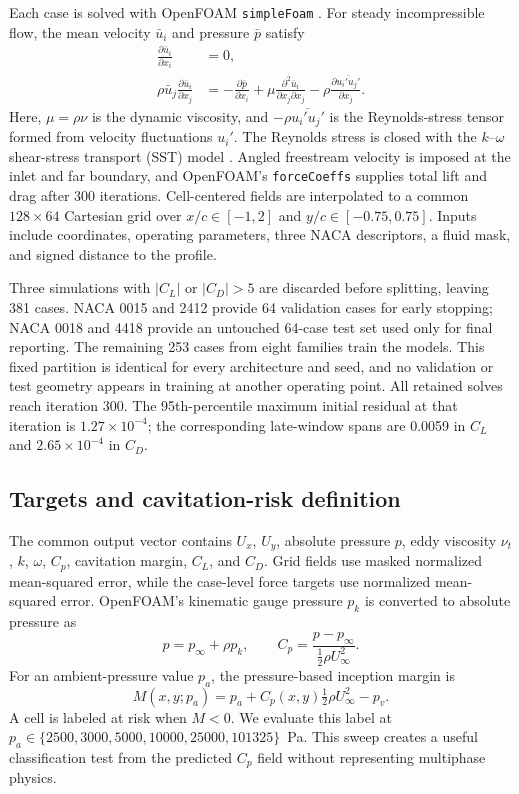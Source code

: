 \documentclass{article}
\begin{document}
Each case is solved with OpenFOAM \texttt{simpleFoam}
\citep{weller1998tensorial}. For steady incompressible flow, the mean velocity
$\bar{u}_i$ and pressure $\bar{p}$ satisfy
\begin{align}
\frac{\partial \bar{u}_i}{\partial x_i}&=0,\\
\rho\bar{u}_j\frac{\partial\bar{u}_i}{\partial x_j}
&=-\frac{\partial\bar{p}}{\partial x_i}
+\mu\frac{\partial^2\bar{u}_i}{\partial x_j\partial x_j}
-\rho\frac{\partial\overline{u_i'u_j'}}{\partial x_j}.
\end{align}
Here, $\mu=\rho\nu$ is the dynamic viscosity, and
$-\rho\overline{u_i'u_j'}$ is the Reynolds-stress tensor formed from velocity
fluctuations $u_i'$. The Reynolds stress is closed with the $k$--$\omega$
shear-stress transport (SST) model \citep{menter1994sst}. Angled freestream velocity is imposed at the inlet and
far boundary, and OpenFOAM's \texttt{forceCoeffs} supplies total lift and drag
after 300 iterations. Cell-centered fields are interpolated to a common
$128\times64$ Cartesian grid over $x/c\in[-1,2]$ and
$y/c\in[-0.75,0.75]$. Inputs include coordinates, operating parameters, three
NACA descriptors, a fluid mask, and signed distance to the profile.

Three simulations with $|C_L|$ or $|C_D|>5$ are discarded before splitting,
leaving 381 cases. NACA 0015 and 2412 provide 64 validation cases for early
stopping; NACA 0018 and 4418 provide an untouched 64-case test set used only
for final reporting. The remaining 253 cases from eight families train the
models. This fixed partition is identical for every architecture and seed, and
no validation or test geometry appears in training at another operating point.
All retained solves reach iteration 300. The 95th-percentile maximum initial
residual at that iteration is $1.27\times10^{-4}$; the corresponding
late-window spans are 0.0059 in $C_L$ and $2.65\times10^{-4}$ in $C_D$.

\subsection{Targets and cavitation-risk definition}
The common output vector contains $U_x$, $U_y$, absolute pressure $p$, eddy viscosity $\nu_t$, $k$, $\omega$, $C_p$, cavitation margin, $C_L$, and $C_D$. Grid fields use masked normalized mean-squared error, while the case-level force targets use normalized mean-squared error. OpenFOAM's kinematic gauge pressure $p_k$ is converted to absolute pressure as
\begin{equation}
 p=p_\infty+\rho p_k, \qquad C_p=\frac{p-p_\infty}{\tfrac{1}{2}\rho U_\infty^2}.
\end{equation}
For an ambient-pressure value $p_a$, the pressure-based inception margin is
\begin{equation}
 M(x,y;p_a)=p_a+C_p(x,y)\tfrac{1}{2}\rho U_\infty^2-p_v.
\end{equation}
A cell is labeled at risk when $M<0$. We evaluate this label at $p_a\in\{2500,3000,5000,10000,25000,101325\}$~Pa. This sweep creates a useful classification test from the predicted $C_p$ field without representing multiphase physics.
\end{document}
